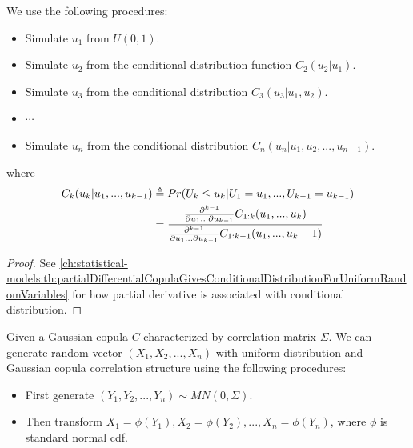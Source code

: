 \begin{refsection}
\begin{lemma}
	We use the following procedures:
	\begin{itemize}
		\item Simulate $u_1$ from $U(0,1)$.
		\item Simulate $u_2$ from the conditional distribution function $C_2(u_2|u_1)$.
		\item Simulate $u_3$ from the conditional distribution $C_3(u_3|u_1,u_2)$.
		\item $\cdots$
		\item Simulate $u_n$ from the conditional distribution $C_n(u_n|u_1,u_2,...,u_{n-1})$.
	\end{itemize}	
where
\begin{align*}
C_k(u_k|u_1,...,u_{k-1}) &\triangleq Pr(U_k\leq u_k|U_1=u_1,...,U_{k-1}=u_{k-1}) \\
&=\frac{\frac{\partial^{k-1}}{\partial u_1 ... \partial u_{k-1}} C_{1:k}(u_1,...,u_k)}{\frac{\partial^{k-1}}{\partial u_1 ... \partial u_{k-1}} C_{1:k-1}(u_1,...,u_k-1)}
\end{align*}
\end{lemma}
\begin{proof}
See \autoref{ch:statistical-models:th:partialDifferentialCopulaGivesConditionalDistributionForUniformRandomVariables} for how partial derivative is associated with conditional distribution.	
\end{proof}


\begin{lemma}
	Given a Gaussian copula $C$ characterized by correlation matrix  $\Sigma$. 	
	We can generate random vector $(X_1,X_2,...,X_n)$ with uniform distribution and Gaussian copula correlation structure  using the following procedures:
	\begin{itemize}
		\item First generate $(Y_1,Y_2,...,Y_n) \sim MN(0,\Sigma)$.
		\item Then transform $X_1 = \phi(Y_1),X_2 = \phi(Y_2),...,X_n = \phi(Y_n)$, where $\phi$ is standard normal cdf.
	\end{itemize}


\end{lemma}
\end{refsection}

